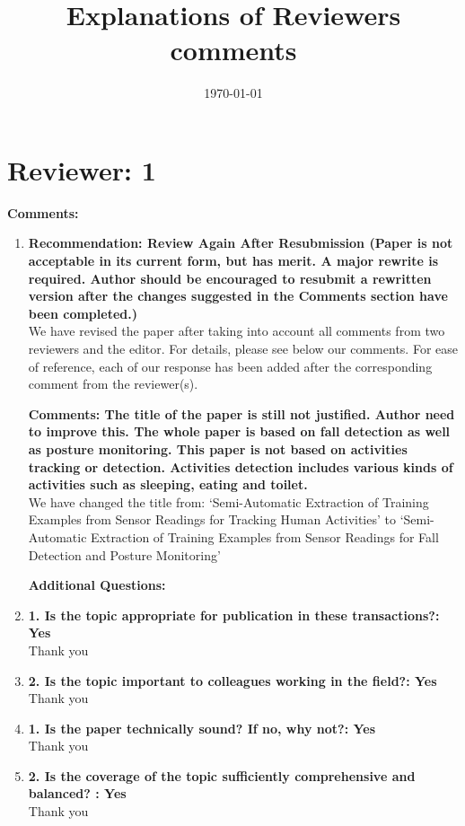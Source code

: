 \documentclass[11pt]{article}
\title{Explanations of Reviewers comments}
\date{\today}
\begin{document}
\maketitle
\section*{Reviewer: 1}


\textbf{Comments:}

\begin{enumerate}

\item\textbf{Recommendation: Review Again After Resubmission (Paper is not acceptable in its current form, but has merit. A major rewrite is required. Author should be encouraged to resubmit a rewritten version after the changes suggested in the Comments section have been completed.)}\\
We have revised the paper after taking into account all comments from two reviewers and the editor. For details, please see below our comments. For ease of reference, each of our response has been added after the corresponding comment from the reviewer(s).

\textbf{Comments:
The title of the paper is still not justified. Author need to improve this. The whole paper is based on fall detection as well as posture monitoring. This paper is not based on activities tracking or detection. Activities detection includes various kinds of activities such as sleeping, eating and toilet.}\\
 We have changed the title from: `Semi-Automatic Extraction of Training Examples from Sensor Readings for Tracking Human  Activities' to `Semi-Automatic Extraction of Training Examples from Sensor Readings for Fall Detection and Posture Monitoring'

\textbf{Additional Questions:}
\item\textbf{1. Is the topic appropriate for publication in these transactions?: Yes}\\
Thank  you

\item\textbf{2. Is the topic important to colleagues working in the field?: Yes}\\
Thank you

\item \textbf{1. Is the paper technically sound? If no, why not?: Yes
}\\
Thank you

\item \textbf{2. Is the coverage of the topic sufficiently comprehensive and balanced? : Yes
}\\
Thank you


\end{enumerate}
\end{document}
